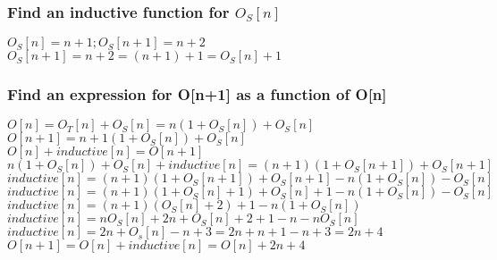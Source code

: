 \documentclass[11pt]{article}
\begin{document}
\subsubsection{Find an inductive function for $O_S[n]$}
\begin{center}
$
O_S[n] = n + 1; O_S[n+1] = n+2
$
\\ \vspace{2mm}
$
O_S[n+1] = n + 2 = (n+1) + 1 = O_S[n] + 1
$
\end{center}

\subsubsection{Find an expression for O[n+1] as a function of O[n]}
\begin{center}
$
O[n] = O_T[n] + O_S[n] =n(1+O_S[n]) + O_S[n]
$
\\ \vspace{2mm}
$
O[n+1] = n+1(1+O_S[n]) + O_S[n]
$
\\ \vspace{2mm}
$
O[n] + inductive[n] = O[n+1]
$
\\ \vspace{2mm}
$
n(1+O_S[n]) + O_S[n] + inductive[n] =  (n+1)(1+O_S[n + 1]) + O_S[n + 1] 
$
\\ \vspace{2mm}
$
inductive[n] =  (n+1)(1+O_S[n + 1]) + O_S[n + 1]  - n(1+O_S[n]) - O_S[n]
$
\\ \vspace{2mm}
$
inductive[n] =  (n+1)(1+O_S[n] + 1) + O_S[n] + 1  - n(1+O_S[n]) - O_S[n]
$
\\ \vspace{2mm}
$
inductive[n] =  (n+1)(O_S[n] + 2) + 1  - n(1+O_S[n])
$
\\ \vspace{2mm}
$
inductive[n] =  nO_S[n] + 2n + O_S[n] + 2 + 1 - n - nO_S[n]
$
\\ \vspace{2mm}
$
inductive[n] =  2n + O_s[n] - n + 3 = 2n + n + 1 - n + 3 = 2n + 4
$
\\ \vspace{4mm}
$
O[n+1] = O[n] + inductive[n] = O[n] + 2n + 4
$

\end{center}
\end{document}
